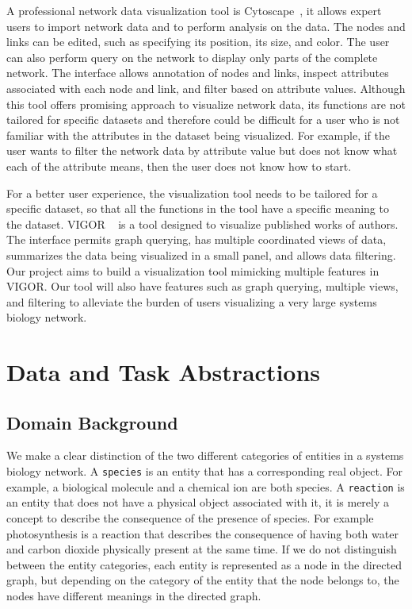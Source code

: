 \documentclass[journal]{vgtc}                %
\begin{document}
A professional network data visualization tool is Cytoscape~\cite{shannon2003cytoscape}, it allows expert users to import network data and to perform analysis on the data. The nodes and links can be edited, such as specifying its position, its size, and color.  The user can also perform query on the network to display only parts of the complete network. The interface allows annotation of nodes and links, inspect attributes associated with each node and link, and filter based on attribute values. Although this tool offers promising approach to visualize network data, its functions are not tailored for specific datasets and therefore could be difficult for a user who is not familiar with the attributes in the dataset being visualized. For example, if the user wants to filter the network data by attribute value but does not know what each of the attribute means, then the user does not know how to start. 

For a better user experience, the visualization tool needs to be tailored for a specific dataset, so that all the functions in the tool have a specific meaning to the dataset. VIGOR ~\cite{pienta2017vigor} is a tool designed to visualize published works of authors. The interface permits graph querying, has multiple coordinated views of data, summarizes the data being visualized in a small panel, and allows data filtering. Our project aims to build a visualization tool mimicking multiple features in VIGOR. Our tool will also have features such as graph querying, multiple views, and filtering to alleviate the burden of users visualizing a very large systems biology network.

\section{Data and Task Abstractions}

\subsection{Domain Background}
We make a clear distinction of the two different categories of entities in a systems biology network. A \texttt{species} is an entity that has a corresponding real object. For example, a biological molecule and a chemical ion are both species. A \texttt{reaction} is an entity that does not have a physical object associated with it, it is merely a concept to describe the consequence of the presence of species. For example photosynthesis is a reaction that describes the consequence of having both water and carbon dioxide physically present at the same time. If we do not distinguish between the entity categories, each entity is represented as a node in the directed graph, but depending on the category of the entity that the node belongs to, the nodes have different meanings in the directed graph. 
\end{document}
